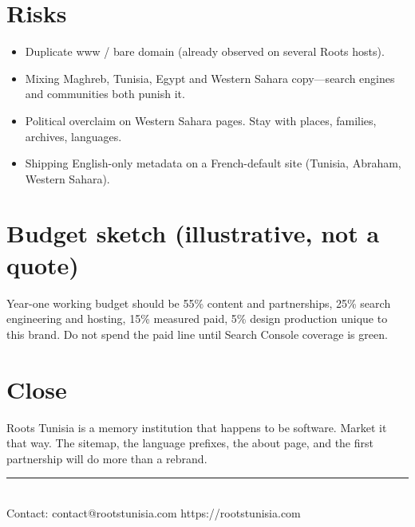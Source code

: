 \documentclass[11pt,a4paper]{article}
\begin{document}
\section{Risks}
\begin{itemize}
  \item Duplicate www / bare domain (already observed on several Roots hosts).
  \item Mixing Maghreb, Tunisia, Egypt and Western Sahara copy---search engines and communities both punish it.
  \item Political overclaim on Western Sahara pages. Stay with places, families, archives, languages.
  \item Shipping English-only metadata on a French-default site (Tunisia, Abraham, Western Sahara).
\end{itemize}

\section{Budget sketch (illustrative, not a quote)}
Year-one working budget should be 55\% content and partnerships, 25\% search engineering and hosting, 15\% measured paid, 5\% design production unique to this brand. Do not spend the paid line until Search Console coverage is green.

\section{Close}
Roots Tunisia is a memory institution that happens to be software. Market it that way. The sitemap, the language prefixes, the about page, and the first partnership will do more than a rebrand.

\vspace{1.4em}
{\color{rule}\rule{\textwidth}{0.6pt}}\\[0.4em]
{\sffamily\small Contact: contact@rootstunisia.com \quad https://rootstunisia.com}
\end{document}
